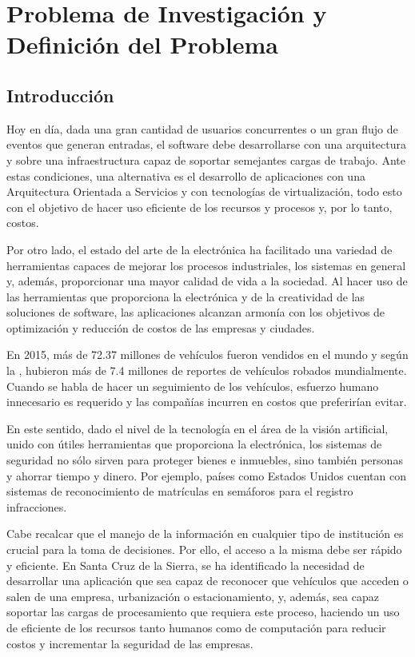 \chapter{Problema de Investigación y Definición del Problema}
\section{Introducción}

    Hoy en día, dada una gran cantidad de usuarios concurrentes o un gran flujo de eventos que generan entradas, el software debe desarrollarse con una arquitectura y sobre una infraestructura capaz de soportar semejantes cargas de trabajo. Ante estas condiciones, una alternativa es el desarrollo de aplicaciones con una Arquitectura Orientada a Servicios y con tecnologías de virtualización, todo esto con el objetivo de hacer uso eficiente de los recursos y procesos y, por lo tanto, costos.
    
    Por otro lado, el estado del arte de la electrónica ha facilitado una variedad de herramientas capaces de mejorar los procesos industriales, los sistemas en general y, además, proporcionar una mayor calidad de vida a la sociedad. Al hacer uso de las herramientas que proporciona la electrónica y de la creatividad de las soluciones de software, las aplicaciones alcanzan armonía con los objetivos de optimización y reducción de costos de las empresas y ciudades. 
    
    En 2015, más de 72.37 millones de vehículos fueron vendidos en el mundo \parencite{Statista2016-qw} y según la \cite{Interpol2015-lz}, hubieron más de 7.4 millones de reportes de vehículos robados mundialmente. Cuando se habla de hacer un seguimiento de los vehículos, esfuerzo humano innecesario es requerido y las compañías incurren en costos que preferirían evitar.
    
    En este sentido, dado el nivel de la tecnología en el área de la visión artificial, unido con útiles herramientas que proporciona la electrónica, los sistemas de seguridad no sólo sirven para proteger bienes e inmuebles, sino también personas y ahorrar tiempo y dinero. Por ejemplo, países como Estados Unidos cuentan con sistemas de reconocimiento de matrículas en semáforos para el registro infracciones. 
    
    Cabe recalcar que el manejo de la información en cualquier tipo de institución es crucial para la toma de decisiones. Por ello, el acceso a la misma debe ser rápido y eficiente. En Santa Cruz de la Sierra, se ha identificado la necesidad de desarrollar una aplicación que sea capaz de reconocer que vehículos que acceden o salen de una empresa, urbanización o estacionamiento, y, además, sea capaz soportar las cargas de procesamiento que requiera este proceso, haciendo un uso de eficiente de los recursos tanto humanos como de computación para reducir costos y incrementar la seguridad de las empresas.
